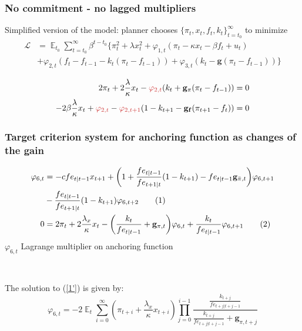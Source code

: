 \documentclass[10pt]{beamer}
\newcommand\numberthis{\addtocounter{equation}{1}\tag{\theequation}} %
\DeclareMathOperator{\E}{\mathbb{E}}
\begin{document}
\begin{frame}[plain]  %
	\frametitle{No commitment - no lagged multipliers}
	\label{no_commitment_intuition}
	
	Simplified version of the model: planner chooses $\{\pi_t, x_t, f_t, k_t\}_{t=t_0}^{\infty}$ to minimize
 \begin{align*}
\mathcal{L} &= \E_{t_0}\sum_{t=t_0}^{\infty} \beta^{t-t_0}\bigg\{ \pi_t^2  + \lambda x_t^2 + \varphi_{1,t} (\pi_t -\kappa x_t- \beta f_t +u_t) \\ &+ \varphi_{2,t}(f_t - f_{t-1} -k_t(\pi_t - f_{t-1})) + \varphi_{3,t}(k_t- \mathbf{g}(\pi_t - f_{t-1})) \bigg\}
 \end{align*}

 \begin{align}
  2\pi_t +2\frac{\lambda}{\kappa}x_t -\textcolor{brownreddark}{\varphi_{2,t}}(k_t + \mathbf{g_{\pi}}(\pi_t -f_{t-1}))& = 0 \label{simpleFOC1} \\
  -2\beta\frac{\lambda}{\kappa}x_t + \textcolor{brownreddark}{\varphi_{2,t}} -\textcolor{brownreddark}{\varphi_{2,t+1}}(1-k_{t+1} -\mathbf{g_{f}}(\pi_{t+1} -f_{t})) & = 0 \label{simpleFOC2} 
 \end{align}

  
\hyperlink{no_commitment}{}	


\end{frame}



\begin{frame}[plain]  %
	\frametitle{Target criterion system for anchoring function as changes of the gain}
	\label{generalTC}

\begin{align*}
\varphi_{6,t} & = -c fe_{t|t-1} x_{t+1} + \bigg(1+ \frac{fe_{t|t-1}}{fe_{t+1|t}}(1-k_{t+1}) -fe_{t|t-1} \mathbf{g}_{\bar{\pi},t} \bigg) \varphi_{6,t+1} \\
& -\frac{fe_{t|t-1}}{fe_{t+1|t}}(1-k_{t+1})\varphi_{6,t+2} \numberthis \label{6'} \\
0 & = 2\pi_t + 2\frac{\lambda_x}{\kappa}x_t   - \bigg( \frac{k_t}{fe_{t|t-1}} + \mathbf{g}_{\pi,t}\bigg)\varphi_{6,t} + \frac{k_t}{fe_{t|t-1}}\varphi_{6,t+1}\numberthis \label{1'}
\end{align*}
$\varphi_{6,t}$ Lagrange multiplier on anchoring function

\

The solution to (\ref{1'}) is given by:
\begin{equation}
\varphi_{6,t} = -2\E_t\sum_{i=0}^{\infty}(\pi_{t+i}+\frac{\lambda_x}{\kappa}x_{t+i})\prod_{j=0}^{i-1}\frac{\frac{k_{t+j}}{fe_{t+j|t+j-1}}}{\frac{k_{t+j}}{fe_{t+j|t+j-1}} + \mathbf{g}_{\pi, t+j}} \label{sol1'}
\end{equation}


\vspace{-0.5cm}
 
\hyperlink{anchTC}{}	


\end{frame}
\end{document}
